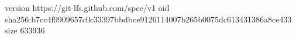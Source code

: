 version https://git-lfs.github.com/spec/v1
oid sha256:b7cc4f9909657c0c33397bbdbce9126114007b265b0075dc613431386a8ce433
size 633936
